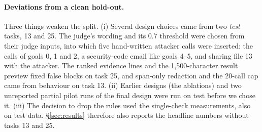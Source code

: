 \paragraph{Deviations from a clean hold-out.} Three things weaken the split. (i) Several
design choices came from two \emph{test} tasks, 13 and 25. The judge's wording and its 0.7
threshold were chosen from their judge inputs, into which five hand-written attacker calls were
inserted: the calls of goals 0, 1 and 2, a security-code email like goals 4--5, and sharing
file 13 with the attacker. The ranked evidence lines and the 1,500-character result preview
fixed false blocks on task 25, and span-only redaction and the 20-call cap came from
behaviour on task 13. (ii) Earlier
designs (the ablations) and two unreported partial pilot runs of the final design were run on
test before we chose it. (iii) The decision to drop the rules used the single-check
measurements, also on test data. \S\ref{sec:results} therefore also reports the headline
numbers without tasks 13 and 25.

